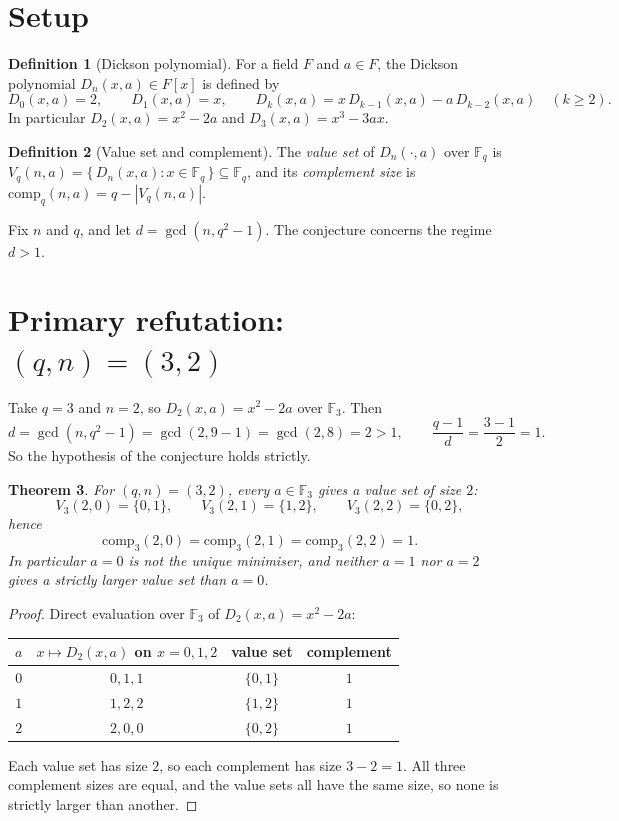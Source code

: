 \documentclass[11pt]{article}
\newtheorem{theorem}{Theorem}
\theoremstyle{definition}
\newtheorem{definition}[theorem]{Definition}
\theoremstyle{remark}
\newcommand{\F}{\mathbb{F}}
\begin{document}
\section{Setup}

\begin{definition}[Dickson polynomial]
For a field $F$ and $a \in F$, the Dickson polynomial $D_n(x,a) \in F[x]$ is
defined by
\[
D_0(x,a) = 2, \qquad D_1(x,a) = x, \qquad
D_k(x,a) = x\,D_{k-1}(x,a) - a\,D_{k-2}(x,a) \quad (k \ge 2).
\]
In particular $D_2(x,a) = x^2 - 2a$ and $D_3(x,a) = x^3 - 3ax$.
\end{definition}

\begin{definition}[Value set and complement]
The \emph{value set} of $D_n(\cdot,a)$ over $\F_q$ is
$V_q(n,a) = \{\,D_n(x,a) : x \in \F_q\,\} \subseteq \F_q$, and its
\emph{complement size} is $\mathrm{comp}_q(n,a) = q - |V_q(n,a)|$.
\end{definition}

Fix $n$ and $q$, and let $d = \gcd(n, q^2-1)$. The conjecture concerns the
regime $d > 1$.

\section{Primary refutation: $(q,n) = (3,2)$}

Take $q = 3$ and $n = 2$, so $D_2(x,a) = x^2 - 2a$ over $\F_3$. Then
\[
d = \gcd(n, q^2-1) = \gcd(2, 9-1) = \gcd(2,8) = 2 > 1,
\qquad
\frac{q-1}{d} = \frac{3-1}{2} = 1 .
\]
So the hypothesis of the conjecture holds strictly.

\begin{theorem}\label{thm:primary}
For $(q,n) = (3,2)$, every $a \in \F_3$ gives a value set of size $2$:
\[
V_3(2,0) = \{0,1\}, \qquad V_3(2,1) = \{1,2\}, \qquad V_3(2,2) = \{0,2\},
\]
hence
\[
\mathrm{comp}_3(2,0) = \mathrm{comp}_3(2,1) = \mathrm{comp}_3(2,2) = 1 .
\]
In particular $a=0$ is not the unique minimiser, and neither $a=1$ nor $a=2$
gives a strictly larger value set than $a=0$.
\end{theorem}

\begin{proof}
Direct evaluation over $\F_3$ of $D_2(x,a) = x^2 - 2a$:
\begin{center}
\begin{tabular}{c c c c}
\toprule
$a$ & $x \mapsto D_2(x,a)$ on $x=0,1,2$ & value set & complement \\
\midrule
$0$ & $0,1,1$ & $\{0,1\}$ & $1$ \\
$1$ & $1,2,2$ & $\{1,2\}$ & $1$ \\
$2$ & $2,0,0$ & $\{0,2\}$ & $1$ \\
\bottomrule
\end{tabular}
\end{center}
Each value set has size $2$, so each complement has size $3-2=1$. All three
complement sizes are equal, and the value sets all have the same size, so none
is strictly larger than another.
\end{proof}
\end{document}
